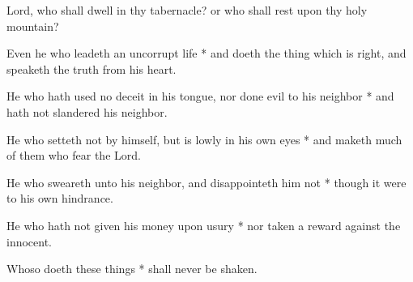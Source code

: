 Lord, who shall dwell in thy tabernacle? or who shall rest upon thy holy mountain?

Even he who leadeth an uncorrupt life * and doeth the thing which is right, and speaketh the truth from his heart.

He who hath used no deceit in his tongue, nor done evil to his neighbor * and hath not slandered his neighbor.

He who setteth not by himself, but is lowly in his own eyes * and maketh much of them who fear the Lord.

He who sweareth unto his neighbor, and disappointeth him not * though it were to his own hindrance.

He who hath not given his money upon usury * nor taken a reward against the innocent.

Whoso doeth these things * shall never be shaken.